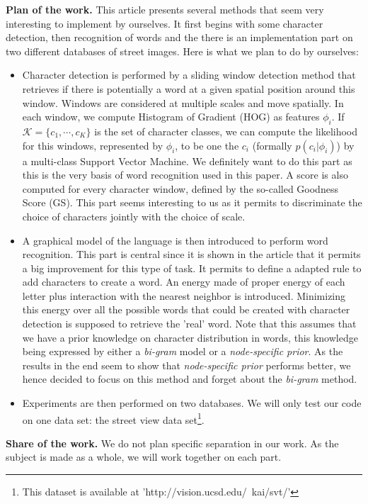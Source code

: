 \documentclass[10pt]{article}
\begin{document}
\textbf{Plan of the work. }This article presents several methods that seem very interesting to implement by ourselves. It first begins with some character detection, then recognition of words and the there is an implementation part on two different databases of street images. Here is what we plan to do by ourselves: 
\begin{itemize}
\item Character detection is performed by a sliding window detection method that retrieves if there is potentially a word at a given spatial position around this window. Windows are considered at multiple scales and move spatially. In each window, we compute Histogram of Gradient (HOG) as features $\phi_i$. If $\mathcal{K} = \{c_1,\cdots, c_K \}$ is the set of character classes, we can compute the likelihood for this windows, represented by $\phi_i$, to be one the $c_i$ (formally $p(c_i|\phi_i)$) by a multi-class Support Vector Machine. We definitely want to do this part as this is the very basis of word recognition used in this paper. A score is also computed for every character window, defined by the so-called Goodness Score (GS). This part seems interesting to us as it permits to discriminate the choice of characters jointly with the choice of scale.

\item A graphical model of the language is then introduced to perform word recognition. This part is central since it is shown in the article that it permits a big improvement for this type of task. It permits to define a adapted rule to add characters to create a word. An energy made of proper energy of each letter plus interaction with the nearest neighbor is introduced. Minimizing this energy over all the possible words that could be created with character detection is supposed to retrieve the 'real' word. Note that this assumes that we have a prior knowledge on character distribution in words, this knowledge being expressed by either a \emph{bi-gram} model or a \emph{node-specific prior}. As the results in the end seem to show that \emph{node-specific prior} performs better, we hence decided to focus on this method and forget about the \emph{bi-gram} method.

\item Experiments are then performed on two databases. We will only test our code on one data set: the street view data set\footnote{ This dataset is available at 'http://vision.ucsd.edu/~kai/svt/'}.\\
\end{itemize}


\textbf{Share of the work. }We do not plan specific separation in our work. As the subject is made as a whole, we will work together on each part. 
\end{document}

